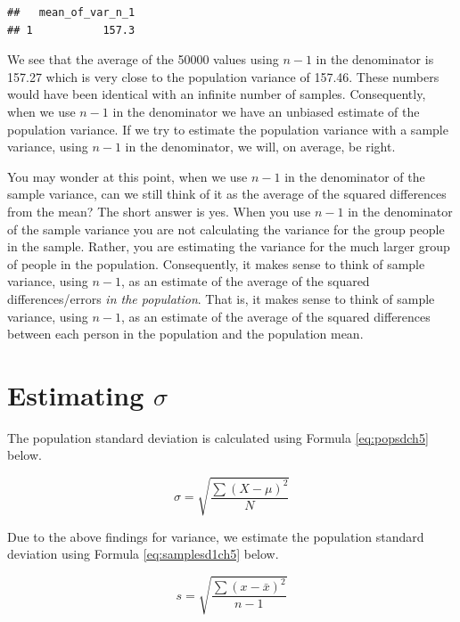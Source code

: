 \documentclass[
]{krantz}
\begin{document}
\begin{verbatim}
##   mean_of_var_n_1
## 1           157.3
\end{verbatim}

We see that the average of the 50000 values using \(n-1\) in the denominator is 157.27 which is very close to the population variance of 157.46. These numbers would have been identical with an infinite number of samples. Consequently, when we use \(n-1\) in the denominator we have an unbiased estimate of the population variance. If we try to estimate the population variance with a sample variance, using \(n-1\) in the denominator, we will, on average, be right.

You may wonder at this point, when we use \(n-1\) in the denominator of the sample variance, can we still think of it as the average of the squared differences from the mean? The short answer is yes. When you use \(n-1\) in the denominator of the sample variance you are not calculating the variance for the group people in the sample. Rather, you are estimating the variance for the much larger group of people in the population. Consequently, it makes sense to think of sample variance, using \(n-1\), as an estimate of the average of the squared differences/errors \emph{in the population}. That is, it makes sense to think of sample variance, using \(n-1\), as an estimate of the average of the squared differences between each person in the population and the population mean.

\hypertarget{estimating-sigma}{%
\section{\texorpdfstring{Estimating \(\sigma\)}{Estimating \textbackslash sigma}}\label{estimating-sigma}}

The population standard deviation is calculated using Formula \eqref{eq:popsdch5} below.

\begin{equation} 
\sigma = \sqrt{\frac{\sum{(X- \mu)^2}}{N}}
      \label{eq:popsdch5}
\end{equation}

Due to the above findings for variance, we estimate the population standard deviation using Formula \eqref{eq:samplesd1ch5} below.

\begin{equation} 
s = \sqrt{\frac{\sum{(x - \bar{x})^2}}{n-1}}
      \label{eq:samplesd1ch5}
\end{equation}
\end{document}
